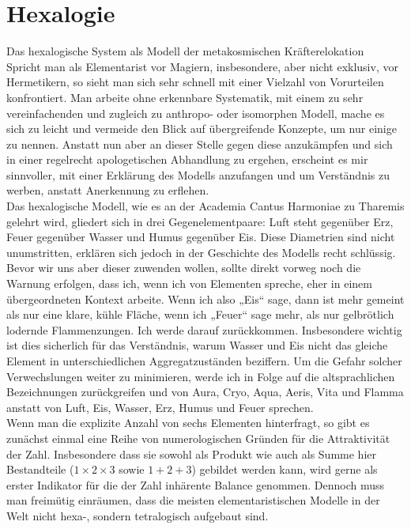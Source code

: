 \documentclass[a5paper,8pt]{book}
\begin{document}
\newpage

\section{Hexalogie}

Das hexalogische System als Modell der metakosmischen Kräfterelokation\\

Spricht man als Elementarist vor Magiern, insbesondere, aber nicht exklusiv, vor Hermetikern, so sieht man sich sehr schnell mit einer Vielzahl von Vorurteilen konfrontiert. 
Man arbeite ohne erkennbare Systematik, mit einem zu sehr vereinfachenden und zugleich zu anthropo- oder isomorphen Modell, mache es sich zu leicht und vermeide den Blick auf 
übergreifende Konzepte, um nur einige zu nennen.
Anstatt nun aber an dieser Stelle gegen diese anzukämpfen und sich in einer regelrecht apologetischen Abhandlung zu ergehen, erscheint es mir sinnvoller, mit einer Erklärung 
des Modells anzufangen und um Verständnis zu werben, anstatt Anerkennung zu erflehen.\\

Das hexalogische Modell, wie es an der Academia Cantus Harmoniae zu Tharemis gelehrt wird, gliedert sich in drei Gegenelementpaare: Luft steht gegenüber Erz, Feuer gegenüber 
Wasser und Humus gegenüber Eis. Diese Diametrien sind nicht unumstritten, erklären sich jedoch in der Geschichte des Modells recht schlüssig.
Bevor wir uns aber dieser zuwenden wollen, sollte direkt vorweg noch die Warnung erfolgen, dass ich, wenn ich von Elementen spreche, eher in einem übergeordneten Kontext 
arbeite. Wenn ich also „Eis“ sage, dann ist mehr gemeint als nur eine klare, kühle Fläche, wenn ich „Feuer“ sage mehr, als nur gelbrötlich lodernde Flammenzungen. Ich werde 
darauf zurückkommen. Insbesondere wichtig ist dies sicherlich für das Verständnis, warum Wasser und Eis nicht das gleiche Element in unterschiedlichen Aggregatzuständen 
beziffern.
Um die Gefahr solcher Verwechslungen weiter zu minimieren, werde ich in Folge auf die altsprachlichen Bezeichnungen zurückgreifen und von Aura, Cryo, Aqua, Aeris, Vita und 
Flamma anstatt von Luft, Eis, Wasser, Erz, Humus und Feuer sprechen.\\

Wenn man die explizite Anzahl von sechs Elementen hinterfragt, so gibt es zunächst einmal eine Reihe von numerologischen Gründen für die Attraktivität der Zahl. Insbesondere 
dass sie sowohl als Produkt wie auch als Summe hier Bestandteile ($1 \times 2  \times 3$ sowie $1 + 2 + 3$) gebildet werden kann, wird gerne als erster Indikator für die der Zahl inhärente 
Balance genommen. Dennoch muss man freimütig einräumen, dass die meisten elementaristischen Modelle in der Welt nicht hexa-, sondern tetralogisch aufgebaut sind.\\
\end{document}
